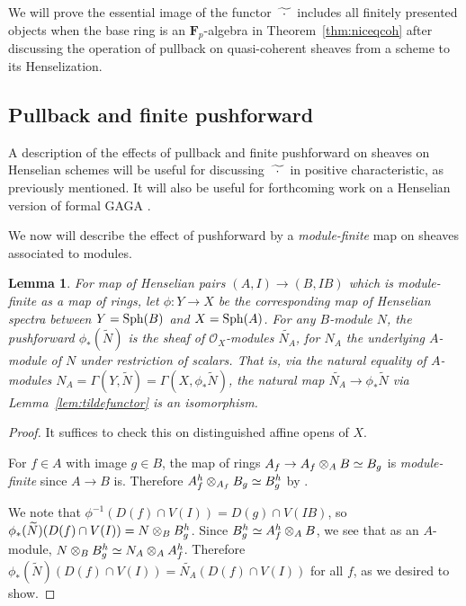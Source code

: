 \documentclass[12pt]{article}
\renewcommand{\O}{\mathscr{O}}
\newcommand{\sph}{{\rm Sph}}
\newcommand{\spcite}[2]{\cite[\href{https://stacks.math.columbia.edu/tag/#1}{{#2} {#1}}]{stackp}}
\newtheorem{lemma}[theorem]{Lemma}
\theoremstyle{definition}
\numberwithin{equation}{subsection}
\begin{document}
We will prove the essential image of the functor $\fwt$ includes all finitely presented objects when the base ring is an $\mathbf{F}_p$-algebra in Theorem~\ref{thm:niceqcoh} after discussing the operation of pullback on quasi-coherent sheaves from a scheme to its Henselization.

\subsection{Pullback and finite pushforward}

A description of the effects of pullback and finite pushforward on sheaves on Henselian schemes will be useful for discussing $\fwt$ in positive characteristic, as previously mentioned. It will also be useful for forthcoming work on a Henselian version of formal GAGA \cite{ghga}.

We now will describe the effect of pushforward by a {\it module-finite} map on sheaves associated to modules.

\begin{lemma}\label{lem:modpush} For map of Henselian pairs $(A,I) \to (B,IB)$ which is module-finite as a map of rings, let $\phi: Y \to X$ be the corresponding map of Henselian spectra between $Y = \sph(B)$ and $X = \sph(A)$. For any $B$-module $N$, the pushforward $\phi_*(\widetilde{N})$ is the sheaf of $\O_X$-modules $\widetilde{N_A}$, for $N_A$ the underlying $A$-module of $N$ under restriction of scalars. That is, via the natural equality of $A$-modules $N_A = \Gamma(Y,\widetilde{N})=\Gamma(X,\phi_*\widetilde{N})$, the natural map $\widetilde{N_A} \to \phi_* \widetilde{N}$ via Lemma~\ref{lem:tildefunctor} is an isomorphism.
\end{lemma}
\begin{proof}  It suffices to check this on distinguished affine opens of $X$. 

For $f \in A$ with image $g \in B$, the map of rings $A_f \to A_f \tens_A B \simeq B_g$ is {\it module-finite} since $A \to B$ is. Therefore $A_f^h \tens_{A_f} B_g \simeq B_g^h$ by \spcite{0DYE}{Lemma}. 

We note that $\phi^{-1}(D(f) \cap V(I)) = D(g) \cap V(IB)$, so $\phi_*(\widetilde{N})(D(f) \cap V(I)) = N \tens_B B_g^h$. Since $B_g^h \simeq A_f^h \tens_A B$, we see that as an $A$-module, $N \tens_B B_g^h \simeq N_A \tens_A A_f^h$. Therefore $\phi_*(\widetilde{N})(D(f) \cap V(I)) = \widetilde{N_A}(D(f) \cap V(I))$ for all $f$, as we desired to show.\end{proof}
\end{document}
